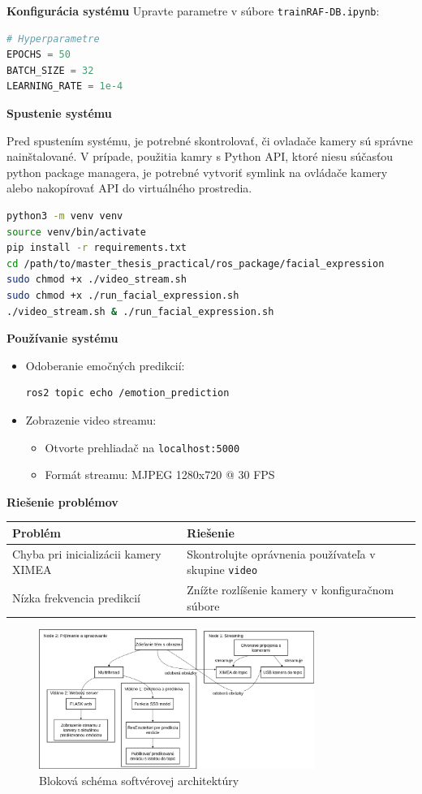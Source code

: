 \textbf{Konfigurácia systému}  
Upravte parametre v súbore \texttt{trainRAF-DB.ipynb}:
\begin{lstlisting}[language=Python]
# Hyperparametre
EPOCHS = 50
BATCH_SIZE = 32
LEARNING_RATE = 1e-4
\end{lstlisting}

\textbf{Spustenie systému}  

Pred spustením systému, je potrebné skontrolovať, či ovladače kamery sú správne nainštalované. V prípade, použitia kamry s Python API, ktoré niesu súčasťou python package managera, je potrebné vytvoriť symlink na ovládače kamery alebo nakopírovať API do virtuálného prostredia.
\begin{lstlisting}[language=bash]
python3 -m venv venv
source venv/bin/activate
pip install -r requirements.txt
cd /path/to/master_thesis_practical/ros_package/facial_expression
sudo chmod +x ./video_stream.sh
sudo chmod +x ./run_facial_expression.sh
./video_stream.sh & ./run_facial_expression.sh
\end{lstlisting}

\textbf{Používanie systému}  
\begin{itemize}
\item Odoberanie emočných predikcií:
\begin{lstlisting}[language=bash]
ros2 topic echo /emotion_prediction
\end{lstlisting}

\item Zobrazenie video streamu:
\begin{itemize}
\item Otvorte prehliadač na \texttt{localhost:5000}
\item Formát streamu: MJPEG 1280x720 @ 30 FPS
\end{itemize}
\end{itemize}

\textbf{Riešenie problémov}  

\begin{tabular}{|p{6cm}|p{9cm}|}
\hline
Problém & Riešenie \\
\hline
Chyba pri inicializácii kamery XIMEA & Skontrolujte oprávnenia používateľa v skupine \texttt{video} \\
Nízka frekvencia predikcií & Znížte rozlíšenie kamery v konfiguračnom súbore \\
\hline
\end{tabular}

\begin{figure}[!htpb]
\centering
\includegraphics[width=0.8\textwidth]{img/ros2_nodes.png}
\caption{Bloková schéma softvérovej architektúry}
\label{fig:ros2_nodes}
\end{figure}

